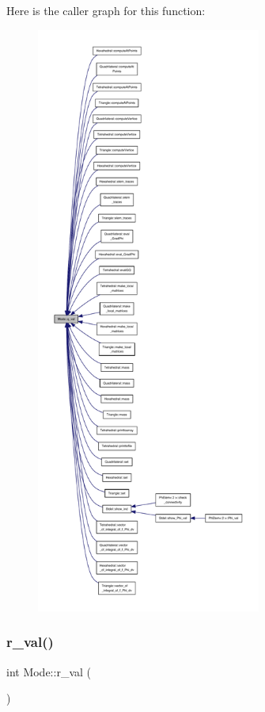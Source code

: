 Here is the caller graph for this function\+:
\nopagebreak
\begin{figure}[H]
\begin{center}
\leavevmode
\includegraphics[height=550pt]{classMode_a5c50861f423cbfea476d37d1dfa4e1cb_icgraph}
\end{center}
\end{figure}
\mbox{\label{classMode_aa9c1bb027a3ba5c83f08dcd936aced32}} 
\subsubsection{\texorpdfstring{r\+\_\+val()}{r\_val()}}
{\footnotesize\ttfamily int Mode\+::r\+\_\+val (\begin{DoxyParamCaption}{ }\end{DoxyParamCaption})\hspace{0.3cm}{\ttfamily [inline]}}



